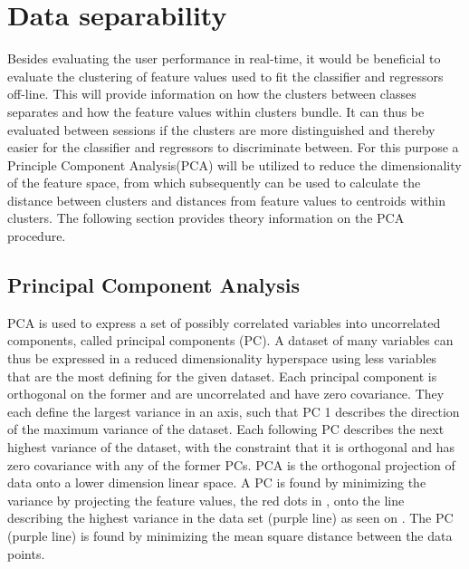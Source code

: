 \section{Data separability}
Besides evaluating the user performance in real-time, it would be beneficial to evaluate the clustering of feature values used to fit the classifier and regressors off-line. This will provide information on how the clusters between classes separates and how the feature values within clusters bundle. It can thus be evaluated between sessions if the clusters are more distinguished and thereby easier for the classifier and regressors to discriminate between. For this purpose a Principle Component Analysis(PCA) will be utilized to reduce the dimensionality of the feature space, from which subsequently can be used to calculate the distance between clusters and distances from feature values to centroids within clusters. The following section provides theory information on the PCA procedure. 


\subsection{Principal Component Analysis}
PCA is used to express a set of possibly correlated variables into uncorrelated components, called principal components (PC). A dataset of many variables can thus be expressed in a reduced dimensionality hyperspace using less variables that are the most defining for the given dataset. Each principal component is orthogonal on the former and are uncorrelated and have zero covariance. They each define the largest variance in an axis, such that PC 1 describes the direction of the maximum variance of the dataset. Each following PC describes the next highest variance of the dataset, with the constraint that it is orthogonal and has zero covariance with any of the former PCs.
PCA is the orthogonal projection of data onto a lower dimension linear space. A PC is found by minimizing the variance by projecting the feature values, the red dots in , onto the line describing the highest variance in the data set (purple line) as seen on . The PC (purple line) is found by minimizing the mean square distance between the data points. 

